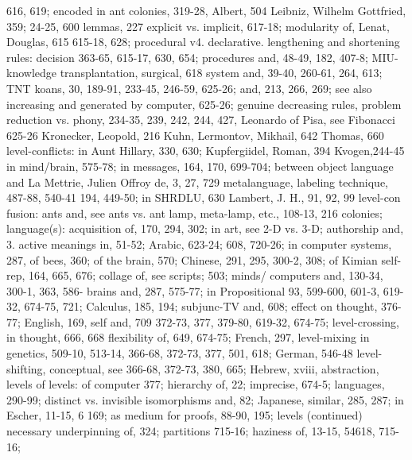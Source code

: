 616, 619; encoded in ant colonies, 319-28,      Albert, 504 Leibniz, Wilhelm Gottfried,
359;                                            24-25, 600 lemmas, 227
explicit vs. implicit, 617-18; modularity of,   Lenat, Douglas, 615
615-18, 628; procedural v4. declarative.        lengthening and shortening rules: decision
363-65, 615-17, 630, 654;                       procedures and, 48-49, 182, 407-8; MIU-
knowledge transplantation, surgical, 618        system and, 39-40, 260-61, 264, 613; TNT
koans, 30, 189-91, 233-45, 246-59, 625-26;      and, 213, 266, 269; see also increasing and
generated by computer, 625-26; genuine          decreasing rules, problem reduction
vs. phony, 234-35, 239, 242, 244, 427,          Leonardo of Pisa, see Fibonacci
625-26 Kronecker, Leopold, 216 Kuhn,            Lermontov, Mikhail, 642
Thomas, 660                                     level-conflicts: in Aunt Hillary, 330, 630;
Kupfergiidel, Roman, 394 Kvogen,244-45          in mind/brain, 575-78; in messages, 164,
                                                170, 699-704; between object language and
La Mettrie, Julien Offroy de, 3, 27, 729        metalanguage,
labeling technique, 487-88, 540-41              194, 449-50; in SHRDLU, 630
Lambert, J. H., 91, 92, 99                      level-con fusion: ants and, see ants vs. ant
lamp, meta-lamp, etc., 108-13, 216              colonies;
language(s): acquisition of, 170, 294, 302;     in art, see 2-D vs. 3-D; authorship and, 3.
active meanings in, 51-52; Arabic, 623-24;      608, 720-26; in computer systems, 287,
of bees, 360; of the brain, 570; Chinese,       291, 295, 300-2, 308; of Kimian self-rep,
164, 665, 676; collage of, see scripts;         503; minds/
computers and, 130-34, 300-1, 363, 586-         brains and, 287, 575-77; in Propositional
93, 599-600, 601-3, 619-32, 674-75, 721;        Calculus, 185, 194; subjunc-TV and, 608;
effect on thought, 376-77; English, 169,        self and, 709
372-73, 377, 379-80, 619-32, 674-75;            level-crossing, in thought, 666, 668
flexibility of, 649, 674-75; French, 297,       level-mixing in genetics, 509-10, 513-14,
366-68, 372-73, 377, 501, 618; German,          546-48 level-shifting, conceptual, see
366-68, 372-73, 380, 665; Hebrew, xviii,        abstraction, levels of levels: of computer
377; hierarchy of, 22; imprecise, 674-5;        languages, 290-99; distinct vs.
invisible isomorphisms and, 82; Japanese,       similar, 285, 287; in Escher, 11-15, 6
169; as medium for proofs, 88-90, 195;          levels (continued)
necessary underpinning of, 324; partitions      715-16; haziness of, 13-15, 54618, 715-16;
